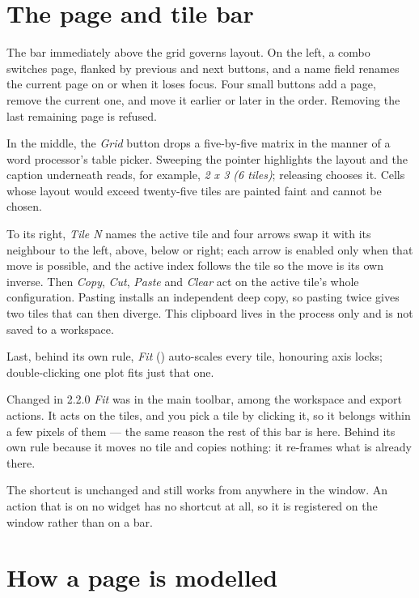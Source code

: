 \documentclass[11pt,a4paper,oneside]{report}
\newcommand{\appver}{2.2.0}
\newcommand{\key}[1]{\textsf{\small\fbox{#1}}}
\begin{document}
\section{The page and tile bar}

The bar immediately above the grid governs layout. On the left, a combo switches
page, flanked by previous and next buttons, and a name field renames the current
page on \key{Enter} or when it loses focus. Four small buttons add a page,
remove the current one, and move it earlier or later in the order. Removing the
last remaining page is refused.

In the middle, the \emph{Grid} button drops a five-by-five matrix in the manner
of a word processor's table picker. Sweeping the pointer highlights the layout
and the caption underneath reads, for example, \emph{2 x 3 (6 tiles)}; releasing
chooses it. Cells whose layout would exceed twenty-five tiles are painted faint
and cannot be chosen.

To its right, \emph{Tile N} names the active tile and four arrows swap it with
its neighbour to the left, above, below or right; each arrow is enabled only when
that move is possible, and the active index follows the tile so the move is its
own inverse. Then \emph{Copy}, \emph{Cut}, \emph{Paste} and \emph{Clear} act
on the active tile's whole configuration. Pasting installs an independent deep
copy, so pasting twice gives two tiles that can then diverge. This clipboard
lives in the process only and is not saved to a workspace.

Last, behind its own rule, \emph{Fit} (\key{Ctrl+0}) auto-scales every tile,
honouring axis locks; double-clicking one plot fits just that one.

\begin{aoenew}{Changed in \appver}
\emph{Fit} was in the main toolbar, among the workspace and export actions. It
acts on the tiles, and you pick a tile by clicking it, so it belongs within a
few pixels of them --- the same reason the rest of this bar is here. Behind its
own rule because it moves no tile and copies nothing: it re-frames what is
already there.

The shortcut is unchanged and still works from anywhere in the window. An
action that is on no widget has no shortcut at all, so it is registered on the
window rather than on a bar.
\end{aoenew}

\section{How a page is modelled}
\end{document}
